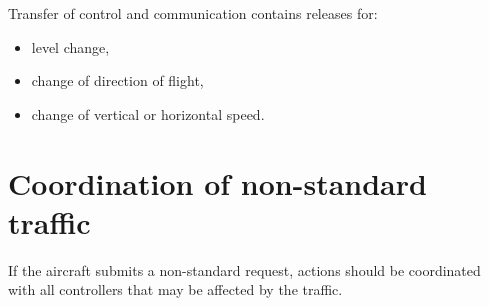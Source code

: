 Transfer of control and communication contains releases for:

\begin{itemize}
\item level change,
\item change of direction of flight,
\item change of vertical or horizontal speed.
\end{itemize}

\section{Coordination of non-standard traffic}

If the aircraft submits a non-standard request, actions should be
coordinated with all controllers that may be affected by the traffic.

